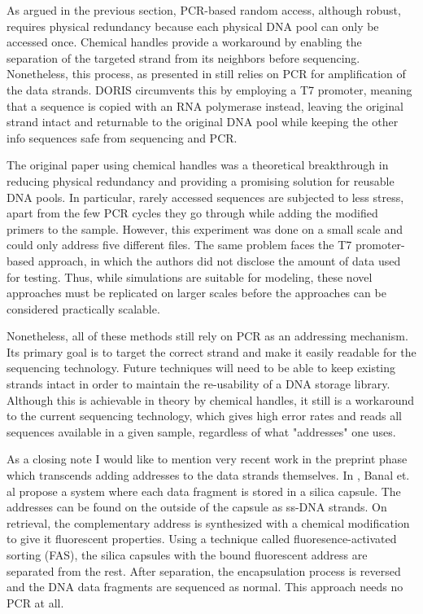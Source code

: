 \documentclass[a4paper,conference]{IEEEtran}
\begin{document}
As argued in the previous section, PCR-based random access, although robust, requires physical redundancy because each physical DNA pool can only be accessed once. Chemical handles provide a workaround by enabling the separation of the targeted strand from its neighbors before sequencing. Nonetheless, this process, as presented in \cite{tomek_driving_2019} still relies on PCR for amplification of the data strands. DORIS circumvents this by employing a T7 promoter, meaning that a sequence is copied with an RNA polymerase instead, leaving the original strand intact and returnable to the original DNA pool while keeping the other info sequences safe from sequencing and PCR.

The original paper using chemical handles was a theoretical breakthrough in reducing physical redundancy and providing a promising solution for reusable DNA pools. In particular, rarely accessed sequences are subjected to less stress, apart from the few PCR cycles they go through while adding the modified primers to the sample. However, this experiment was done on a small scale and could only address five different files. The same problem faces the T7 promoter-based approach, in which the authors did not disclose the amount of data used for testing. Thus, while simulations are suitable for modeling, these novel approaches must be replicated on larger scales before the approaches can be considered practically scalable. 

Nonetheless, all of these methods still rely on PCR as an addressing mechanism. Its primary goal is to target the correct strand and make it easily readable for the sequencing technology. Future techniques will need to be able to keep existing strands intact in order to maintain the re-usability of a DNA storage library. Although this is achievable in theory by chemical handles, it still is a workaround to the current sequencing technology, which gives high error rates and reads all sequences available in a given sample, regardless of what "addresses" one uses. 

As a closing note I would like to mention very recent work in the preprint phase which transcends adding addresses to the data strands themselves. In \cite{banal_random_2021}, Banal et. al propose a system where each data fragment is stored in a silica capsule. The addresses can be found on the outside of the capsule as ss-DNA strands. On retrieval, the complementary address is synthesized with a chemical modification to give it fluorescent properties. Using a technique called fluoresence-activated sorting (FAS), the silica capsules with the bound fluorescent address are separated from the rest. After separation, the encapsulation process is reversed and the DNA data fragments are sequenced as normal. This approach needs no PCR at all.
\end{document}

